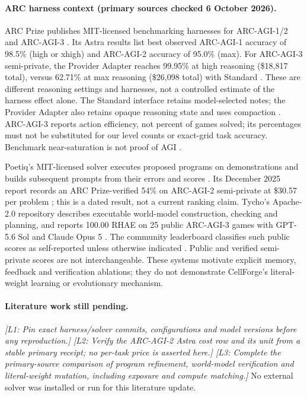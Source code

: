 \documentclass[11pt]{article}
\begin{document}
\paragraph{ARC harness context (primary sources checked 6 October 2026).}
ARC Prize publishes MIT-licensed benchmarking harnesses for ARC-AGI-1/2 and ARC-AGI-3
\cite{arc12harness,arc3harness}. Its Astra results list best observed ARC-AGI-1 accuracy of
98.5\% (high or xhigh) and ARC-AGI-2 accuracy of 95.0\% (max). For ARC-AGI-3 semi-private,
the Provider Adapter reaches 99.95\% at high reasoning (\$18{,}817 total), versus 62.71\%
at max reasoning (\$26{,}098 total) with Standard \cite{astraresults,astrablog}.
These are different reasoning settings and harnesses, not a controlled estimate of the harness
effect alone. The Standard interface retains model-selected notes; the Provider Adapter also
retains opaque reasoning state and uses compaction \cite{astrablog}. ARC-AGI-3 reports action
efficiency, not percent of games solved; its percentages must not be substituted for our level
counts or exact-grid task accuracy. Benchmark near-saturation is not proof of AGI
\cite{astrablog}.

Poetiq's MIT-licensed solver executes proposed programs on demonstrations and builds subsequent
prompts from their errors and scores \cite{poetiqcode}. Its December 2025 report records an
ARC Prize-verified 54\% on ARC-AGI-2 semi-private at \$30.57 per problem
\cite{poetiqverified}; this is a dated result, not a current ranking claim. Tycho's Apache-2.0
repository describes executable world-model construction, checking and planning, and reports
100.00 RHAE on 25 public ARC-AGI-3 games with GPT-5.6 Sol and Claude Opus 5
\cite{tycho}. The community leaderboard classifies such public scores as self-reported unless
otherwise indicated \cite{arccommunity}. Public and verified semi-private scores are not
interchangeable. These systems motivate explicit memory, feedback and verification ablations;
they do not demonstrate CellForge's literal-weight learning or evolutionary mechanism.

\paragraph{Literature work still pending.}
\textit{[L1: Pin exact harness/solver commits, configurations and model versions before any
reproduction.] [L2: Verify the ARC-AGI-2 Astra cost row and its unit from a stable primary
receipt; no per-task price is asserted here.] [L3: Complete the primary-source comparison of
program refinement, world-model verification and literal-weight mutation, including exposure
and compute matching.]} No external solver was installed or run for this literature update.
\end{document}
